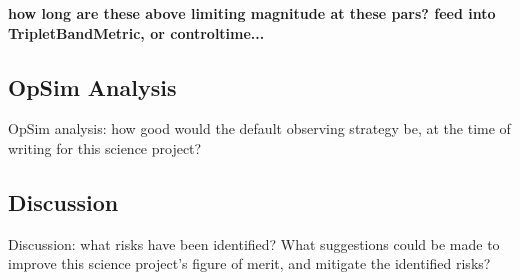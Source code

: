 \textbf{how long are these above limiting magnitude at these pars? feed into TripletBandMetric, or controltime...}


\subsection{OpSim Analysis}
\label{sec:\secname:analysis}

OpSim analysis: how good would the default observing strategy be, at
the time of writing for this science project?



\subsection{Discussion}
\label{sec:\secname:discussion}

Discussion: what risks have been identified? What suggestions could be
made to improve this science project's figure of merit, and mitigate
the identified risks?



\navigationbar
